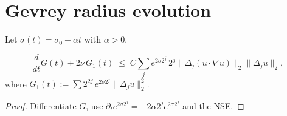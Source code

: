 \section{Gevrey radius evolution}\label{NS:gevrey}

Let $\sigma(t)=\sigma_{0}-\alpha t$ with $\alpha>0$.

\begin{lemma}\label{lem:dGdt}
\[
\frac{d}{dt}G(t)
  +2\nu\,G_{1}(t)
  \;\le\;
  C\sum_{j} e^{2\sigma 2^{j}}\,
        2^{j}\bigl\|\Delta_{j}(u\!\cdot\!\nabla u)\bigr\|_{2}
        \|\Delta_{j}u\|_{2},
\]
where $G_{1}(t):=\sum 2^{2j}\,e^{2\sigma 2^{j}}\|\Delta_{j}u\|_{2}^{2}$.
\end{lemma}

\begin{proof}
Differentiate $G$, use $\partial_{t}e^{2\sigma 2^{j}}=-2\alpha 2^{j} e^{2\sigma 2^{j}}$ and the NSE.
\end{proof} 